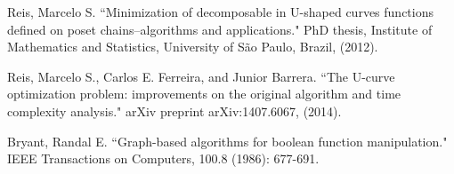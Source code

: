 \documentclass[12pt]{article}
\begin{document}
\begin{thebibliography}{9} \label{sec:referencias}


Reis, Marcelo S. ``Minimization of decomposable in U-shaped curves functions defined on poset chains–algorithms and applications." PhD thesis, Institute of Mathematics and Statistics, University of São Paulo, Brazil, (2012).

Reis, Marcelo S., Carlos E. Ferreira, and Junior Barrera. ``The U-curve optimization problem: improvements on the original algorithm and time complexity analysis." arXiv preprint arXiv:1407.6067, (2014). 


Bryant, Randal E. ``Graph-based algorithms for boolean function manipulation." IEEE Transactions on Computers, 100.8 (1986): 677-691. 


\end{thebibliography}
\end{document}
